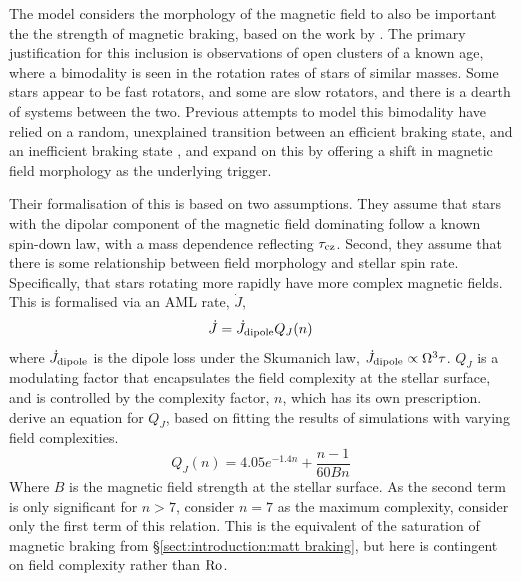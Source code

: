 The \citet{garraffo2018a} model considers the morphology of the magnetic field to also be important the the strength of magnetic braking, based on the work by \citet{garraffo2015}. The primary justification for this inclusion is observations of open clusters of a known age, where a bimodality is seen in the rotation rates of stars of similar masses. Some stars appear to be fast rotators, and some are slow rotators, and there is a dearth of systems between the two. 
Previous attempts to model this bimodality have relied on a random, unexplained transition between an efficient braking state, and an inefficient braking state \citep{spada2011,reiners2012, gallet2013}, and \citet{garraffo2018a} expand on this by offering a shift in magnetic field morphology as the underlying trigger.

Their formalisation of this is based on two assumptions. They assume that stars with the dipolar component of the magnetic field dominating  follow a known spin-down law, with a mass dependence reflecting $\tau_{\rm cz}$. Second, they assume that there is some relationship between field morphology and stellar spin rate. Specifically, that stars rotating more rapidly have more complex magnetic fields. This is formalised via an AML rate, $\dot J$,
\begin{equation}
    \dot J = \dot J_{\rm dipole}Q_J(n)
\end{equation}
where $\dot J_{\rm dipole}$ is the dipole loss under the Skumanich law, $\dot J_{\rm dipole} \propto \Omega^3 \tau$. $Q_J$ is a modulating factor that encapsulates the field complexity at the stellar surface, and is controlled by the complexity factor, $n$, which has its own prescription. \citet{garraffo2016} derive an equation for $Q_J$, based on fitting the results of simulations with varying field complexities.
\begin{equation}
    \label{eqn:introduction:garraffo complexity modulation}
    Q_J(n) = 4.05 e^{-1.4n} + \frac{n-1}{60Bn}
\end{equation}
Where $B$ is the magnetic field strength at the stellar surface. As the second term is only significant for $n > 7$, \citet{garraffo2018a} consider $n = 7$ as the maximum complexity, consider only the first term of this relation. This is the equivalent of the saturation of magnetic braking from \S\ref{sect:introduction:matt braking}, but here is contingent on field complexity rather than $\rm Ro$. 

